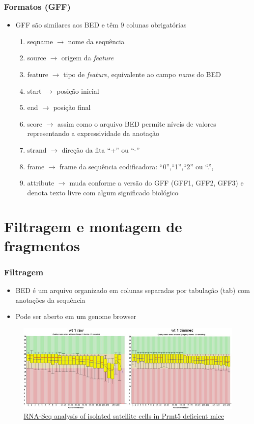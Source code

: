 \documentclass{beamer}
\begin{document}
	\begin{frame}\frametitle{Formatos (GFF)}
		\begin{itemize}
		\item GFF são similares aos BED e têm 9 colunas obrigatórias
		\begin{enumerate}
		\item seqname $\rightarrow$ nome da sequência
		\item source $\rightarrow$ origem da \textit{feature}
		\item feature $\rightarrow$ tipo de \textit{feature}, equivalente ao campo \textit{name} do BED
		\item start $\rightarrow$ posição inicial
		\item end $\rightarrow$ posição final
		\item score $\rightarrow$ assim como o arquivo BED permite níveis de valores representando a expressividade da anotação
		\item strand $\rightarrow$ direção da fita ``+'' ou ``-''
		\item frame $\rightarrow$ frame da sequência codificadora: ``0'',``1'',``2'' ou ``.'',
		\item attribute $\rightarrow$ muda conforme a versão do GFF (GFF1, GFF2, GFF3) e denota texto livre com algum significado biológico
		\end{enumerate}
		\end{itemize}
	\end{frame}

	\section{Filtragem e montagem de fragmentos}
	
		\begin{frame}\frametitle{Filtragem}
		\begin{itemize}
			\item BED é um arquivo organizado em colunas separadas por tabulação (tab) com anotações da sequência
			\item Pode ser aberto em um genome browser
		\end{itemize}
		\begin{figure}[ht]
			\centering
			\includegraphics[scale=0.6]{img/filtragem.png}
			\caption{\tiny{\href{http://dx.doi.org/10.1016/j.gdata.2015.05.013}{RNA-Seq analysis of isolated satellite cells in Prmt5 deficient mice}}}
		\end{figure}
		\end{frame}
	
\end{document}
